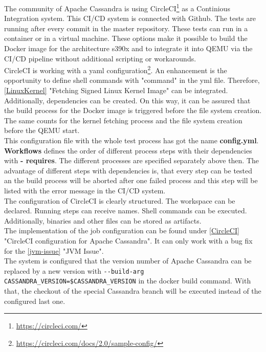 The community of Apache Cassandra is using CircleCI\footnote{\url{https://circleci.com/}} as a Continious Integration system.
This CI/CD system is connected with Github. The tests are running after every commit in the master repository.
These tests can run in a container or in a virtual machine. These options make it possible to build the Docker image for the architecture s390x and to integrate it into QEMU via the CI/CD pipeline without additional scripting or workarounds. \\
CircleCI is working with a yaml configuration\footnote{\url{https://circleci.com/docs/2.0/sample-config/}}. 
An enhancement is the opportunity to define shell commands with "command" in the yml file. Therefore, \ref{LinuxKernel} "Fetching Signed Linux Kernel Image" can be integrated. 
Additionally, dependencies can be created. On this way, it can be assured that the build process for the Docker image is triggered before the file system creation. 
The same counts for the kernel fetching process and the file system creation before the QEMU start. \\
This configuration file with the whole test process has got the name \textbf{config.yml}. \\
\textbf{Workflows} defines the order of different process steps with their dependencies with \textbf{- requires}.
The different processes are specified separately above then. 
The advantage of different steps with dependencies is, that every step can be tested an the build process will be aborted after one failed process and this step will be listed with the error message in the CI/CD system. \\
The configuration of CircleCI is clearly structured. The workspace can be declared. Running steps can receive names. Shell commands can be executed. Additionally, binaries and other files can be stored as artifacts. \\
The implementation of the job configuration can be found under \ref{CircleCI} "CircleCI configuration for Apache Cassandra". It can only work with a bug fix for the \ref{jvm-issue} "JVM Issue".\\
The system is configured that the version number of Apache Cassandra can be replaced by a new version with \verb+--build-arg CASSANDRA_VERSION=$CASSANDRA_VERSION+ in the docker build command. With that, the checkout of the special Cassandra branch will be executed instead of the configured last one.

